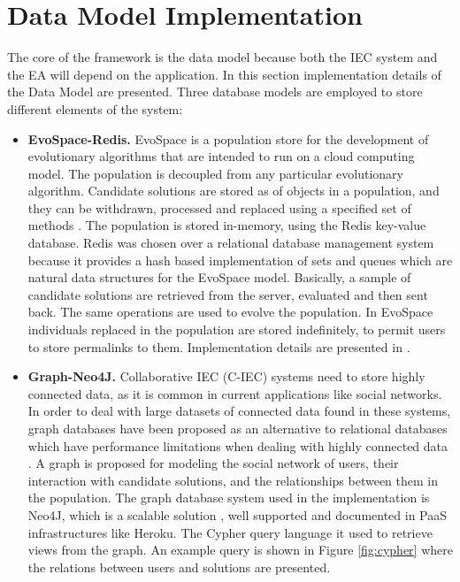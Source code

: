 \section{Data Model Implementation}
\label{sec:implementation}

The core of the framework is the data model because both the IEC system and the EA will 
depend on the application. In this section implementation details of the Data Model are presented.
Three database models are employed to store different elements of the system: 

\begin{itemize}
\item {\bf EvoSpace-Redis.} 
EvoSpace is a population store \cite{Evospace}  for the development of 
evolutionary algorithms that are intended to run on a cloud computing model. 
The population is decoupled from any particular evolutionary algorithm. 
Candidate solutions are stored as of objects in a population, and they can be withdrawn, 
processed and replaced using a specified set of methods \cite{GValdez2015}. The population
is stored in-memory, using the Redis key-value database. Redis was chosen over a relational 
database management system because it provides a hash based implementation of sets and 
queues which are natural data structures for the EvoSpace model. Basically, a sample of 
candidate solutions are retrieved from the server, evaluated and then sent back. 
The same operations are used to evolve the population. In EvoSpace individuals replaced 
in the population are stored indefinitely, to permit users to store permalinks to them.
Implementation details are presented in \cite{garcia2013evospace}.

\item {\bf Graph-Neo4J.} 
 Collaborative IEC (C-IEC) systems need to store highly connected data, as it is common 
 in current applications like social networks. In order to deal with large datasets of connected 
 data found in these systems, graph databases \cite{angles2012comparison} have been proposed 
 as an alternative to relational databases which have performance limitations when dealing with 
 highly connected data \cite{holzschuher2013performance}.
 A graph is proposed for modeling the social network of users, their interaction with 
 candidate solutions, and the relationships between them in the population.
 The graph database system used in the implementation is Neo4J, which is
 a scalable solution \cite{miller2013graph,holzschuher2013performance}, well 
 supported and documented in PaaS infrastructures like Heroku. The Cypher query 
 language it used to retrieve views from the graph.
 An example query is shown in Figure \ref{fig:cypher} where the relations 
 between users and solutions are presented.
  

\end{itemize}

